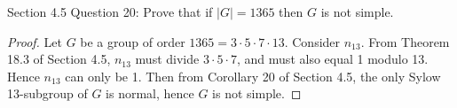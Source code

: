 Section 4.5 Question 20: Prove that if $|G|=1365$ then $G$ is not simple.

\begin{proof}
  Let $G$ be a group of order $1365=3\cdot5\cdot7\cdot13$. Consider
  $n_{13}$. From Theorem 18.3 of Section 4.5, $n_{13}$ must divide
  $3\cdot5\cdot7$, and must also equal 1 modulo 13. Hence $n_{13}$ can
  only be 1. Then from Corollary 20 of Section 4.5, the only Sylow
  13-subgroup of $G$ is normal, hence $G$ is not simple.
\end{proof}
